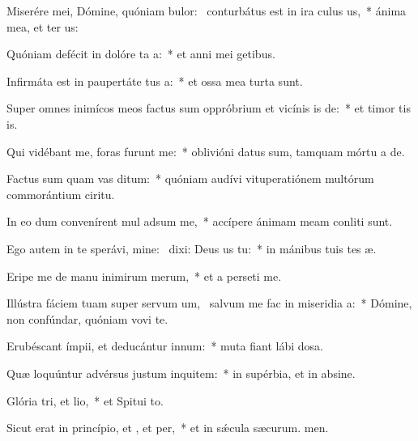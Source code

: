 \item Miserére mei, Dómine, quóniam bulor:~\pscross{} conturbátus est in ira culus us,~* ánima mea, et ter us:
\item Quóniam defécit in dolóre ta a:~* et anni mei  getibus.
\item Infirmáta est in paupertáte tus a:~* et ossa mea turta sunt.
\item Super omnes inimícos meos factus sum oppróbrium et vicínis is de:~* et timor tis is.
\item Qui vidébant me, foras furunt  me:~* oblivióni datus sum, tamquam mórtu a de.
\item Factus sum quam vas ditum:~* quóniam audívi vituperatiónem multórum commorántium  ciritu.
\item In eo dum convenírent mul adsum me,~* accípere ánimam meam conliti sunt.
\item Ego autem in te sperávi, mine:~\pscross{} dixi: Deus us  tu:~* in mánibus tuis tes æ.
\item Eripe me de manu inimirum merum,~* et a perseti me.
\item Illústra fáciem tuam super servum um,~\pscross{} salvum me fac in miseridia a:~* Dómine, non confúndar, quóniam vovi te.
\item Erubéscant ímpii, et deducántur  innum:~* muta fiant lábi dosa.
\item Quæ loquúntur advérsus justum inquitem:~* in supérbia, et in absine.
\item Glória tri, et lio,~* et Spitui to.
\item Sicut erat in princípio, et , et per,~* et in sǽcula sæcurum. men.
